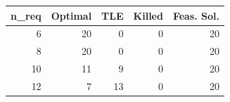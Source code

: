 
\begin{tabular}{rrrrr}
\toprule
n\_req & Optimal & TLE & Killed & Feas. Sol.\\
\midrule
6 & 20 & 0 & 0 & 20\\
8 & 20 & 0 & 0 & 20\\
10 & 11 & 9 & 0 & 20\\
12 & 7 & 13 & 0 & 20\\
\bottomrule
\end{tabular}
